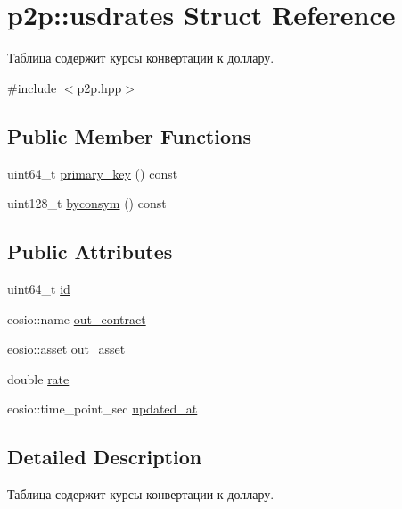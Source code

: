 \hypertarget{structp2p_1_1usdrates}{}\section{p2p\+:\+:usdrates Struct Reference}
\label{structp2p_1_1usdrates}


Таблица содержит курсы конвертации к доллару.  




{\ttfamily \#include $<$p2p.\+hpp$>$}

\subsection*{Public Member Functions}
\begin{DoxyCompactItemize}
\item 
uint64\+\_\+t \mbox{\hyperlink{structp2p_1_1usdrates_a8bdf953b105c26b52b6fe3be2b910925}{primary\+\_\+key}} () const
\item 
uint128\+\_\+t \mbox{\hyperlink{structp2p_1_1usdrates_a6d13bdd9e62d26ca68146e642e330099}{byconsym}} () const
\end{DoxyCompactItemize}
\subsection*{Public Attributes}
\begin{DoxyCompactItemize}
\item 
uint64\+\_\+t \mbox{\hyperlink{structp2p_1_1usdrates_a5f755d95b0efa7942636fddfae33db2f}{id}}
\item 
eosio\+::name \mbox{\hyperlink{structp2p_1_1usdrates_a6e1aa8746a552939956d3aa3e93782d9}{out\+\_\+contract}}
\item 
eosio\+::asset \mbox{\hyperlink{structp2p_1_1usdrates_ac6ba77785a025d183b2378d5b1bb7f69}{out\+\_\+asset}}
\item 
double \mbox{\hyperlink{structp2p_1_1usdrates_a4a0439519abb54675759686a1b5fe43a}{rate}}
\item 
eosio\+::time\+\_\+point\+\_\+sec \mbox{\hyperlink{structp2p_1_1usdrates_a79bb6e9971e40371c8003013887bf294}{updated\+\_\+at}}
\end{DoxyCompactItemize}


\subsection{Detailed Description}
Таблица содержит курсы конвертации к доллару. 

